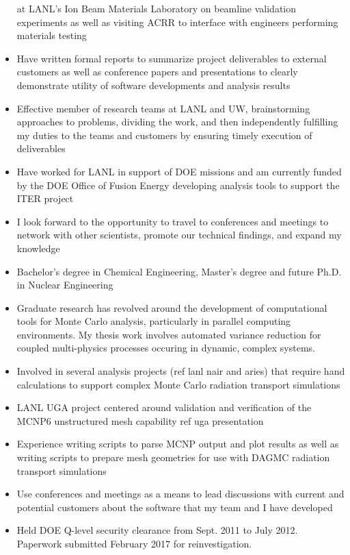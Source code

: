 \documentclass[a4paper,10pt]{article}
\begin{document}
\begin{itemize}[leftmargin=.9in,rightmargin=.875in,itemsep=1.6mm]
			at LANL's Ion Beam Materials Laboratory
			on beamline validation experiments as well as
			visiting ACRR to interface with engineers performing
			materials testing
		\item Have written formal reports to summarize project
			deliverables to external customers as well as conference
			papers and presentations to clearly demonstrate
			utility of software
			developments and analysis results
		\item Effective member of research teams at LANL and
			UW, brainstorming approaches to problems, dividing the
			work, and then independently fulfilling my duties to the teams and
			customers by ensuring timely execution of deliverables
		\item  Have worked for LANL in support of DOE missions and am
			currently funded by the DOE Office of Fusion Energy
			developing analysis tools to support the ITER project 
		\item I look forward to the opportunity to travel to
			conferences and meetings to network with other
			scientists, promote our technical
			findings, and expand my knowledge
               \item Bachelor's degree in Chemical Engineering, Master's degree
		       and future Ph.D. in Nuclear Engineering
	       \item Graduate research has revolved around the development of
		       computational tools for Monte Carlo analysis,
		       particularly in parallel computing environments.  My
		       thesis work involves automated variance reduction for
		       coupled multi-physics processes occuring in dynamic, complex
		       systems.
	       \item Involved in several analysis projects (ref lanl
			       nair and aries) that require
			      hand calculations to support complex Monte
			      Carlo radiation transport simulations
	       \item LANL UGA project centered around validation and
		       verification of the MCNP6 unstructured mesh
		       capability ref uga presentation
	       \item Experience writing scripts to parse MCNP output
	               and plot results as well as writing scripts to
		       prepare mesh geometries for use with DAGMC
		       radiation transport simulations
	       \item Use conferences and meetings as a means to lead
		       discussions with current and potential customers about
		       the software that my team and I have developed
              \item Held DOE Q-level security clearance from Sept. 2011 to July
		      2012. Paperwork submitted February 2017 for
		      reinvestigation.


\end{itemize} 
\end{document}
